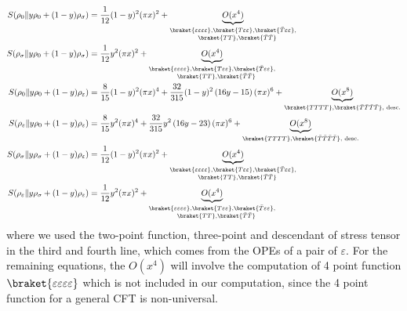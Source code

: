 \documentclass[11pt]{article}
\newcommand{\lb}{\left(}
\newcommand{\rb}{\right)}
\begin{document}
\begin{align}
    S(\rho_0 \| y \rho_0 + (1-y)\rho_\sigma) &= \frac{1}{12} (1-y)^2(\pi x)^2+\underbrace{O(x^{4})}_{\substack {\braket{\varepsilon\varepsilon\varepsilon\varepsilon} ,\braket{T\varepsilon\varepsilon}, \braket{\bar T \varepsilon\varepsilon},\\ \quad \braket{TT},\braket{\bar T \bar T}}}\\
    S(\rho_\sigma \| y \rho_0 + (1-y)\rho_\sigma) &= \frac{1}{12} y^2(\pi x)^2+\underbrace{O(x^{4})}_{\substack {\braket{\varepsilon\varepsilon\varepsilon\varepsilon} ,\braket{T\varepsilon\varepsilon}, \braket{\bar T \varepsilon\varepsilon},\\ \quad \braket{TT},\braket{\bar T \bar T}}} \\ 
    S(\rho_0 \| y \rho_0 + (1-y)\rho_\varepsilon) &= \frac{8}{15} (1-y)^2 (\pi x)^4+\frac{32}{315}(1-y)^2\lb16y - 15\rb (\pi x)^6 + \underbrace{O(x^8)}_{\braket{TTTT},\braket{\bar T\bar T\bar T\bar T}, \text{ desc.}} \\
    S(\rho_\varepsilon \| y \rho_0 + (1-y)\rho_\varepsilon) &= \frac{8}{15} y^2 (\pi x)^4 +\frac{32}{315}y^2\lb16y - 23\rb (\pi x)^6 +\underbrace{O(x^8)}_{\braket{TTTT},\braket{\bar T\bar T\bar T\bar T}, \text{ desc.}}\\
    S(\rho_\sigma \| y \rho_\sigma + (1-y)\rho_\varepsilon) &= \frac{1}{12} (1-y)^2(\pi x)^2+\underbrace{O(x^{4})}_{\substack {\braket{\varepsilon\varepsilon\varepsilon\varepsilon} ,\braket{T\varepsilon\varepsilon}, \braket{\bar T \varepsilon\varepsilon},\\ \quad \braket{TT},\braket{\bar T \bar T}}} \\
    S(\rho_\varepsilon \| y \rho_\sigma + (1-y)\rho_\varepsilon) &= \frac{1}{12} y^2(\pi x)^2+\underbrace{O(x^{4})}_{\substack {\braket{\varepsilon\varepsilon\varepsilon\varepsilon} ,\braket{T\varepsilon\varepsilon}, \braket{\bar T \varepsilon\varepsilon},\\ \quad \braket{TT},\braket{\bar T \bar T}}}
\end{align}
where we used the two-point function, three-point and descendant of stress tensor in the third and fourth line, which comes from the OPEs of a pair of $\varepsilon$. For the remaining equations, the $O(x^4)$ will involve the computation of 4 point function $\braket{\varepsilon\varepsilon\varepsilon\varepsilon}$
which is not included in our computation, since the 4 point function for a general CFT is non-universal.
\end{document}
